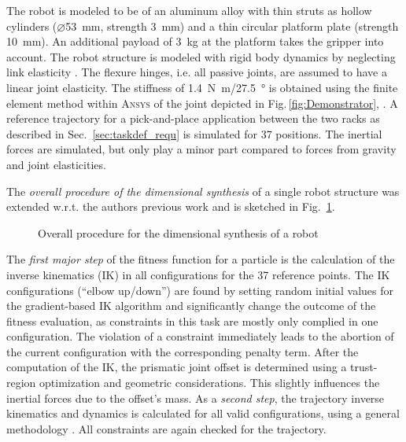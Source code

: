 \documentclass{svproc}
\begin{document}
The robot is modeled to be of an aluminum alloy with thin struts as hollow cylinders ($\diameter$\SI{53}{\milli\metre}, strength \SI{3}{\milli\metre}) and a thin circular platform plate (strength \SI{10}{\milli\metre}).
An additional payload of \SI{3}{\kilogram} at the platform takes the gripper into account.
The robot structure is modeled with rigid body dynamics by neglecting link elasticity \cite{SchapplerOrt2020}.
The flexure hinges, i.e. all passive joints, are assumed to have a linear joint elasticity.
The stiffness of \SI{1.4}{\newton\metre}/\SI{27.5}{\degree} is obtained using the finite element method within  \textsc{Ansys} of the joint depicted in Fig.\,\ref{fig:Demonstrator},  \cite{JahnRaatz2020}.
A reference trajectory for a pick-and-place application between the two racks as described in Sec.~\ref{sec:taskdef_requ} is simulated for 37 positions.
The inertial forces are simulated, but only play a minor part compared to forces from gravity and joint elasticities.

The \emph{overall procedure of the dimensional synthesis} of a single robot structure was extended w.r.t. the authors previous work \cite{SchapplerOrt2020} and is sketched in Fig.~\ref{fig:flowchart_optimization}.
%
%
\begin{figure}[tb]

\caption{Overall procedure for the dimensional synthesis of a robot}
\label{fig:flowchart_optimization}
\end{figure}
The \emph{first major step} of the fitness function for a particle is the calculation of the inverse kinematics (IK) in all configurations for the 37 reference points. 
The IK configurations (``elbow up/down'') are found by setting random initial values for the gradient-based IK algorithm and significantly change the outcome of the fitness evaluation, as constraints in this task are mostly only complied in one configuration.
The violation of a constraint immediately leads to the abortion of the current configuration with the corresponding penalty term.
After the computation of the IK, the prismatic joint offset is determined using a trust-region optimization and geometric considerations.
This slightly influences the inertial forces due to the offset's mass.
%
As a \emph{second step}, the trajectory inverse kinematics and dynamics is calculated for all valid configurations, using a general methodology \cite{Merlet2006,Gogu2008,SchapplerOrt2020}.
All constraints are again checked for the trajectory.
\end{document}
